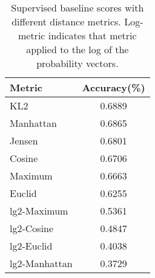 \begin{table}[ht] \centering
\caption{Supervised baseline scores with different distance metrics.
  Log-metric indicates that metric applied to the log of the
  probability vectors.}
\begin{tabular}{|l|c|}
\hline
Metric & Accuracy(\%) \\
\hline
KL2 & 0.6889 \\
Manhattan & 0.6865 \\
Jensen & 0.6801 \\
Cosine & 0.6706 \\
Maximum & 0.6663 \\
Euclid & 0.6255 \\
lg2-Maximum & 0.5361 \\
lg2-Cosine & 0.4847 \\
lg2-Euclid & 0.4038 \\
lg2-Manhattan & 0.3729 \\
\hline
\end{tabular}
\label{tab:distscores}
\end{table}




